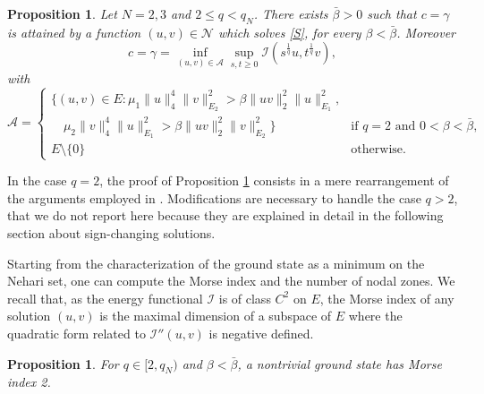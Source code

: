 \documentclass[10pt,a4paper]{amsart}
\numberwithin{equation}{section}
\newtheorem{proposition}[theo]{Proposition}
\begin{document}
\begin{proposition}\label{prop:existence_vec}
Let $N=2,3$ and $2\le q<q_N$. There exists $\bar\beta>0$ such that
$c=\gamma$  is attained by a function $(u,v)\in\mathcal N$ which solves \eqref{S},
for every  $\beta<\bar \beta$.
Moreover
\[
c=\gamma=\inf_{(u,v)\in \mathcal A }  \sup_{s,t\ge 0}
\mathcal I (s^{\frac{1}q}u, t^{\frac{1}q}v),
\]
with
\[
 \mathcal A = \begin{cases}
\big\{ (u,v) \in E  :  \mu_1 \|u\|_{4}^4 \|v\|_{E_2}^2 > \beta \|uv\|_2^2 \|u\|_{E_1}^2 ,\\
 \quad   \mu_2 \|v\|_{4}^4 \|u\|_{E_1}^2 > \beta \|uv\|_2^2 \|v\|_{E_2}^2 \big\}
& \text{if $q=2$ and $0<\beta<\bar\beta$},
\\[3pt]
E\setminus\{0\} & \text{otherwise.}
\end{cases}
 \]
\end{proposition}

In the case $q=2$, the proof of Proposition \ref{prop:existence_vec} consists in
a mere rearrangement of the arguments employed in \cite[Section 2]{LW_AIHP05}.
Modifications are necessary to handle the case $q>2$, that we do not report here
because they are explained in detail in the following section about sign-changing
solutions.

Starting from the  characterization of the ground state as a minimum on the Nehari set,
one can compute the Morse index and  the number of nodal zones.
We recall that, as the energy functional $\mathcal I$ is of class $C^2$ on $E$,
the Morse index of any solution $(u,v)$ is the maximal dimension of a subspace of
$E$ where the quadratic form related to $ \mathcal{I}''(u,v)$
is negative defined.

\begin{proposition}\label{prop:Morse_vec}
For $q\in [2,q_N)$ and $\beta <\bar\beta $, a nontrivial ground state has Morse
index 2.
\end{proposition}
\end{document}
